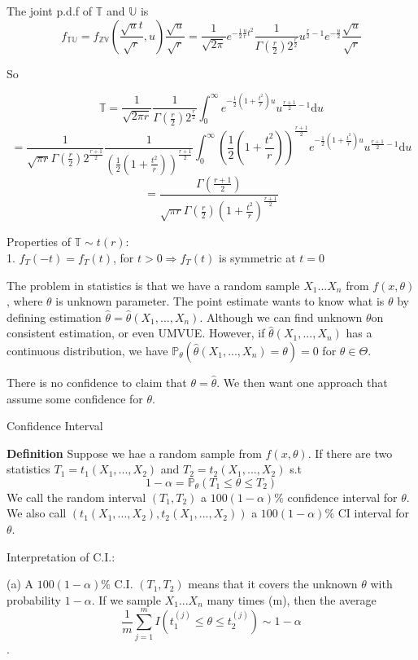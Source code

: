 \documentclass[a4paper,12pt]{article}
\begin{document}
The joint p.d.f of $\mathbb{T}$ and $\mathbb{U}$ is
$$f_{\mathbb{T}\mathbb{U}} = f_{\mathbb{Z}\mathbb{V}}(\frac{\sqrt{u}t}{\sqrt{r}}, u)\frac{\sqrt{u}}{\sqrt{r}} = 
\frac{1}{\sqrt{2\pi}} e^{-\frac{1}{2}\frac{u}{r}t^2} \frac{1}{\Gamma(\frac{r}{2})2^{\frac{r}{2}}}u^{\frac{r}{2}-1}e^{-\frac{u}{2}}\frac{\sqrt{u}}{\sqrt{r}}$$

So

$$\mathbb{T} = \frac{1}{\sqrt{2\pi r}} \frac{1}{\Gamma(\frac{r}{2})2^{\frac{r}{2}}}
\int_0^\infty e^{-\frac{1}{2}(1+\frac{t^2}{r})u} u^{\frac{r+1}{2}-1}\mathrm{d}u$$
$$= \frac{1}{\sqrt{\pi r}\Gamma(\frac{r}{2})2^{\frac{r+1}{2}}} \frac{1}{(\frac{1}{2}(1+\frac{t^2}{r}))^{\frac{r+1}{2}}}
\int_0^\infty (\frac{1}{2}(1+\frac{t^2}{r}))^{\frac{r+1}{2}}e^{-\frac{1}{2}(1+\frac{t^2}{r})u} u^{\frac{r+1}{2}-1}\mathrm{d}u$$
$$= \frac{\Gamma(\frac{r+1}{2})}{\sqrt{\pi r}\Gamma(\frac{r}{2})(1+\frac{t^2}{r})^{\frac{r+1}{2}}}$$

Properties of $\mathbb{T}\sim t(r)$:\\
1. $ f_T(-t) = f_T(t)$, for $t>0 \Rightarrow f_T(t)$ is symmetric at $t=0$

The problem in statistics is that we have a random sample $X_1 ... X_n$ from $f(x, \theta)$, where $\theta$ is unknown parameter. The point estimate wants to know what is $\theta$ by defining estimation $\hat{\theta} = \hat{\theta}(X_1, ..., X_n)$. Although we can find unknown $\theta$on consistent estimation, or even UMVUE. However, if $\hat{\theta}(X_1, ..., X_n)$ has a continuous distribution, we have $\mathbb{P}_\theta(\hat{\theta}(X_1, ..., X_n) = \theta) = 0$ for $\theta \in \Theta$.

There is no confidence to claim that $\theta = \hat{\theta}$. We then want one approach that assume some confidence for $\theta$.

Confidence Interval

\textbf{Definition} Suppose we hae a random sample from $f(x, \theta)$. If there are two statistics $T_1 = t_1(X_1, ..., X_2)$ and 
$T_2 = t_2(X_1, ..., X_2)$ s.t
$$1-\alpha = \mathbb{P}_\theta(T_1 \leq \theta \leq T_2)$$
We call the random interval $(T_1, T_2)$ a $100(1-\alpha)\%$ confidence interval for $\theta$. We also call $(t_1(X_1, ..., X_2), t_2(X_1, ..., X_2))$ a $100(1-\alpha)\%$ CI interval for $\theta$.

Interpretation of C.I.:


(a) A $100(1-\alpha)\%$ C.I. $(T_1,T_2)$ means that it covers the unknown $\theta$ with probability $1-\alpha$. If we sample $X_1...X_n$ many times (m),
then the average $$\frac{1}{m} \sum_{j=1}^m I(t_1^{(j)} \leq \theta \leq t_2^{(j)}) \sim 1-\alpha$$.
\end{document}
